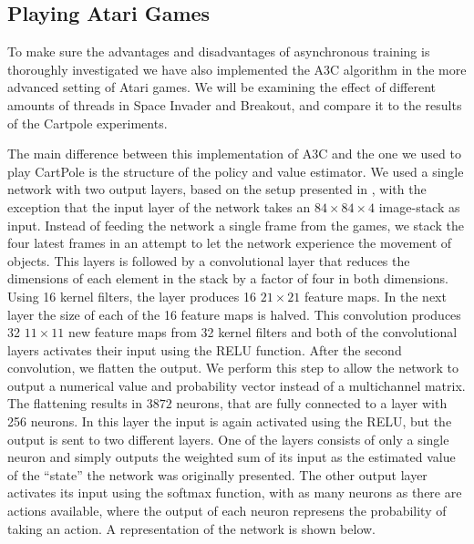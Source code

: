 \documentclass[11pt]{article}
\begin{document}
\subsection{Playing Atari Games}

To make sure the advantages and disadvantages of asynchronous training
is thoroughly investigated we have also implemented the A3C algorithm
in the more advanced setting of Atari games.
We will be examining the effect of different amounts of threads
in Space Invader and Breakout, and compare it to the results
of the Cartpole experiments.

The main difference between this implementation of A3C
and the one we used to play CartPole is the structure of the
policy and value estimator.
We used a single network with two output layers,
based on the setup presented in \cite{dqn-nature}, with the
exception that the input layer of the network takes an $84 \times 84 \times 4$
image-stack as input.
Instead of feeding the network a single frame from the games,
we stack the four latest frames in an attempt to let the network
experience the movement of objects.
This layers is followed by a convolutional layer that reduces the dimensions
of each element in the stack by a factor of four in both dimensions.
Using 16 kernel filters, the layer produces 16
$21 \times 21$ feature maps.
In the next layer the size of each of the 16 feature maps is
halved.
This convolution produces 32 $11 \times 11$ new feature maps
from 32 kernel filters and both of the convolutional layers activates
their input using the RELU function.
After the second convolution, we flatten the output.
We perform this step to allow the network to output a numerical value and
probability vector instead of a multichannel matrix.
The flattening results in $3872$ neurons, that are fully connected to
a layer with 256 neurons.
In this layer the input is again activated using the RELU, but
the output is sent to two different layers.
One of the layers consists of only a single neuron
and simply outputs the weighted sum of its input as the estimated value
of the “state” the network was originally presented.
The other output layer activates its input using the softmax function,
with as many neurons as there are actions available, where
the output of each neuron represens the probability of taking an action.
A representation of the network is shown below.
\end{document}
